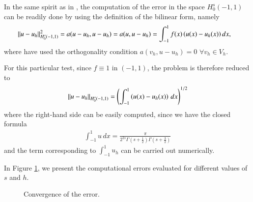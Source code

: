 In the same spirit as in \cite{acosta2017short}, the computation of the error in the space $H_0^s(-1,1)$ can be readily done by using the definition of the bilinear form, namely
\begin{align*}
	{\left\|u-u_h\right\|}_{H_0^s(-1,1)}^2 &=a(u-u_h,u-u_h) =a(u,u-u_h) =\int_{-1}^1f(x)\left(u(x)-u_h(x)\right)dx,
\end{align*}
where have used the orthogonality condition $a(v_h,u-u_h)=0$ $\forall v_h \in V_h$.

For this particular test, since $f\equiv 1$ in $(-1,1)$, the problem is therefore reduced to
\begin{align*}
	{\left\|u-u_h\right\|}_{H^s_0(-1,1)}=\left(\int_{-1}^1\left( u(x)-u_h(x) \right)\,dx\right)^{1/2}
\end{align*}
where the right-hand side can be easily computed, since we have the closed formula 
\begin{align*}
	\int_{-1}^1u\,dx= \frac{\pi}{2^{2s}\Gamma(s+\frac{1}{2})\Gamma(s+\frac{3}{2})}
\end{align*}
and the term corresponding to $\int_{-1}^1u_h$ can be carried out numerically. 

In Figure  \ref{error}, we present the computational errors evaluated for different values of $s$ and $h$. 
\begin{figure}[!h]
 \centering
%
\caption{Convergence of the error.}
\label{error}
\end{figure}

